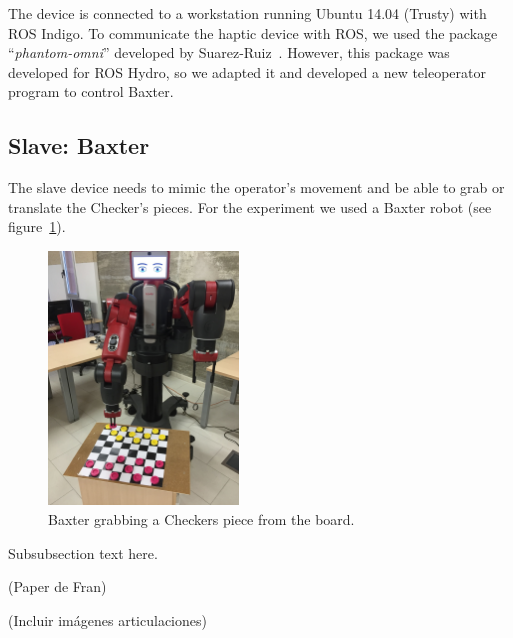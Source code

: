 \documentclass[journal,twoside]{JoPhA}
\begin{document}
  The device is connected to a workstation running Ubuntu 14.04 (Trusty) with ROS Indigo. To communicate the haptic device with ROS, we used the package ``\emph{phantom-{}omni}'' developed by Suarez-Ruiz~\cite{SuarezRuiz12}. However, this package was developed for ROS Hydro, so we adapted it and developed a new teleoperator program to control Baxter.

  \subsection{Slave: Baxter}
  \label{subsec:environment:slave}

  The slave device needs to mimic the operator's movement and be able to grab or translate the Checker's pieces. For the experiment we used a Baxter robot (see figure~\ref{fig:environment:slave}).

\begin{figure}[!ht]
  \centering
  \includegraphics[width=0.45\textwidth]{Images/BaxterDamas1.jpg}
  
  \caption{Baxter grabbing a Checkers piece from the board.}
  \label{fig:environment:slave}
\end{figure}


Subsubsection text here. 

(Paper de Fran)

(Incluir imágenes articulaciones)

%
%
\end{document}
